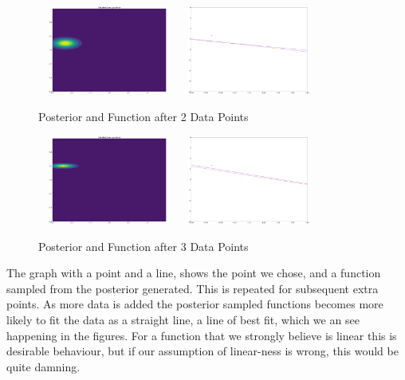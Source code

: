 \documentclass[a4paper, 9pt]{article}
\begin{document}
\begin{figure}[H]
\begin{center}
\includegraphics[width=1.8in,height=1.15in]{posterior2}
\includegraphics[width=1.8in,height=1.15in]{data2} \\
\end{center}
\caption{Posterior and Function after 2 Data Points}
\end{figure}
\begin{figure}[H]
\begin{center}
\includegraphics[width=1.8in,height=1.15in]{posterior3}
\includegraphics[width=1.8in,height=1.15in]{data3} \\
\end{center}
\caption{Posterior and Function after 3 Data Points}
\end{figure}

The graph with a point and a line, shows the point we chose, and a function sampled from the posterior generated. This is repeated for subsequent extra points.
As more data is added the posterior sampled functions becomes more likely to fit the data as a straight line, a line of best fit, which we an see happening in the figures. For a function that we strongly believe is linear this is desirable behaviour, but if our assumption of linear-ness is wrong, this would be quite damning.
\end{document}

